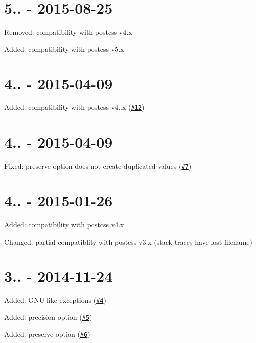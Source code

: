 \section*{5.. -\/ 2015-\/08-\/25}


\begin{DoxyItemize}
\item Removed\+: compatibility with postcss v4.\+x
\item Added\+: compatibility with postcss v5.\+x
\end{DoxyItemize}

\section*{4.. -\/ 2015-\/04-\/09}


\begin{DoxyItemize}
\item Added\+: compatibility with postcss v4..\+x (\href{https://github.com/postcss/postcss-calc/pull/12}{\tt \#12})
\end{DoxyItemize}

\section*{4.. -\/ 2015-\/04-\/09}


\begin{DoxyItemize}
\item Fixed\+: {\ttfamily preserve} option does not create duplicated values (\href{https://github.com/postcss/postcss-calc/issues/7}{\tt \#7})
\end{DoxyItemize}

\section*{4.. -\/ 2015-\/01-\/26}


\begin{DoxyItemize}
\item Added\+: compatibility with postcss v4.\+x
\item Changed\+: partial compatiblity with postcss v3.\+x (stack traces have lost filename)
\end{DoxyItemize}

\section*{3.. -\/ 2014-\/11-\/24}


\begin{DoxyItemize}
\item Added\+: G\+NU like exceptions (\href{https://github.com/postcss/postcss-calc/issues/4}{\tt \#4})
\item Added\+: {\ttfamily precision} option (\href{https://github.com/postcss/postcss-calc/issues/5}{\tt \#5})
\item Added\+: {\ttfamily preserve} option (\href{https://github.com/postcss/postcss-calc/issues/6}{\tt \#6})
\end{DoxyItemize}

